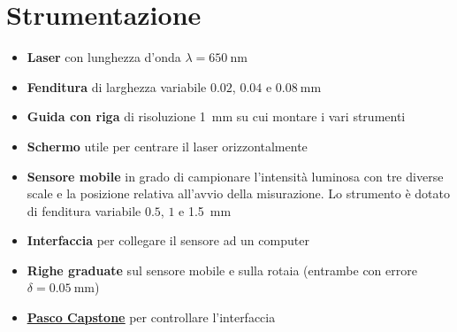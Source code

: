 \documentclass[../main.tex]{subfiles}
\begin{document}
\section{Strumentazione}

\begin{itemize}
    \item \textbf{Laser} con lunghezza d'onda $\lambda = \qty{650}{\nano\meter}$
    \item \textbf{Fenditura} di larghezza variabile $0.02$, $0.04$ e $\qty{0.08}{\milli\meter}$
    \item \textbf{Guida con riga} di risoluzione \qty{1}{\milli\meter} su cui montare i vari strumenti
    \item \textbf{Schermo} utile per centrare il laser orizzontalmente
    \item \textbf{Sensore mobile} in grado di campionare l'intensità luminosa con tre diverse scale e la posizione relativa all'avvio della misurazione. Lo strumento è dotato di fenditura variabile $0.5$, $1$ e \qty{1.5}{\milli\meter}
    \item \textbf{Interfaccia} per collegare il sensore ad un computer
    \item \textbf{Righe graduate} sul sensore mobile e sulla rotaia (entrambe con errore $\delta = \qty{0.05}{\milli\meter}$)
    \item \textbf{\href{https://www.pasco.com/downloads/capstone}{\underline{Pasco Capstone}}} per controllare l'interfaccia
\end{itemize}
\end{document}
